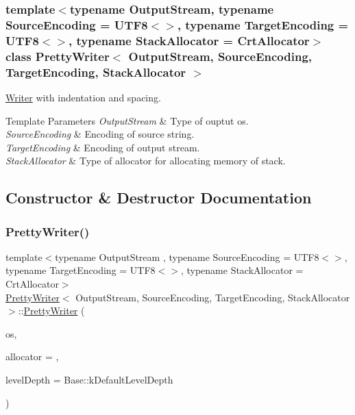 \subsubsection*{template$<$typename Output\+Stream, typename Source\+Encoding = U\+T\+F8$<$$>$, typename Target\+Encoding = U\+T\+F8$<$$>$, typename Stack\+Allocator = Crt\+Allocator$>$\newline
class Pretty\+Writer$<$ Output\+Stream, Source\+Encoding, Target\+Encoding, Stack\+Allocator $>$}

\hyperlink{classWriter}{Writer} with indentation and spacing. 


\begin{DoxyTemplParams}{Template Parameters}
{\em Output\+Stream} & Type of ouptut os. \\
\hline
{\em Source\+Encoding} & Encoding of source string. \\
\hline
{\em Target\+Encoding} & Encoding of output stream. \\
\hline
{\em Stack\+Allocator} & Type of allocator for allocating memory of stack. \\
\hline
\end{DoxyTemplParams}


\subsection{Constructor \& Destructor Documentation}
\mbox{\label{classPrettyWriter_a83f9be5c5d595a08636962e4ddd27b60}} 
\subsubsection{\texorpdfstring{Pretty\+Writer()}{PrettyWriter()}\hspace{0.1cm}{\footnotesize\ttfamily [1/2]}}
{\footnotesize\ttfamily template$<$typename Output\+Stream , typename Source\+Encoding  = U\+T\+F8$<$$>$, typename Target\+Encoding  = U\+T\+F8$<$$>$, typename Stack\+Allocator  = Crt\+Allocator$>$ \\
\hyperlink{classPrettyWriter}{Pretty\+Writer}$<$ Output\+Stream, Source\+Encoding, Target\+Encoding, Stack\+Allocator $>$\+::\hyperlink{classPrettyWriter}{Pretty\+Writer} (\begin{DoxyParamCaption}\item[{Output\+Stream \&}]{os,  }\item[{Stack\+Allocator $\ast$}]{allocator = {},  }\item[{size\+\_\+t}]{level\+Depth = {\ttfamily Base\+:\+:kDefaultLevelDepth} }\end{DoxyParamCaption})\hspace{0.3cm}{\ttfamily [inline]}}



